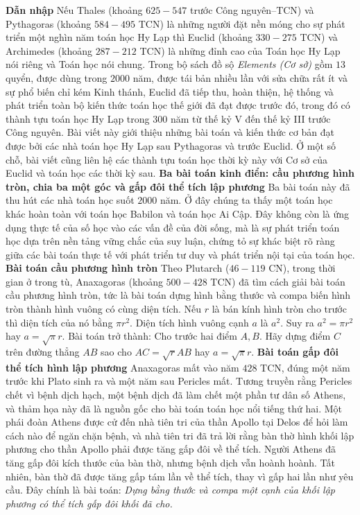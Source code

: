 \begin{multicols}{2}
	\textbf{\color{lichsutoanhoc}Dẫn nhập}
	\vskip 0.05cm
	Nếu Thales (khoảng $625-547$ trước Công nguyên--TCN) và Pythagoras (khoảng $584-495$ TCN) là những người đặt nền móng cho sự phát triển một nghìn năm toán học Hy Lạp thì Euclid (khoảng $330-275$ TCN) và  Archimedes (khoảng $287-212$ TCN) là những đỉnh cao của Toán học Hy Lạp nói riêng và Toán học nói chung. Trong bộ sách đồ sộ \textit{Elements (Cơ sở)}  gồm $13$ quyển, được dùng trong $2000$ năm, được tái bản nhiều lần với sửa chữa rất ít và sự phổ biến chỉ kém Kinh thánh, Euclid đã tiếp thu, hoàn thiện, hệ thống và phát triển toàn bộ kiến thức toán học thế giới đã đạt được trước đó, trong đó có thành tựu toán học Hy Lạp trong $300$ năm từ thế kỷ V đến thế kỷ III trước Công nguyên. 
	\vskip 0.05cm
	Bài viết này giới thiệu những bài toán và kiến thức cơ bản đạt được bởi các nhà toán học Hy Lạp sau Pythagoras và trước Euclid. Ở một số chỗ, bài viết cũng liên hệ các thành tựu toán học thời kỳ này với Cơ sở của Euclid và toán học các thời kỳ sau.    
	\vskip 0.05cm
	\textbf{\color{lichsutoanhoc}Ba bài toán kinh điển: cầu phương hình tròn, chia ba một góc và gấp đôi thể tích lập phương}
	\vskip 0.05cm
	Ba bài toán này đã thu hút các nhà toán học suốt $2000$ năm. Ở đây chúng ta thấy một toán học khác hoàn toàn với toán học Babilon và toán học Ai Cập. Đây không còn là ứng dụng thực tế của số học vào các vấn đề của đời sống, mà là sự phát triển toán học dựa trên nền tảng vững chắc  của suy luận, chứng tỏ sự khác biệt rõ ràng giữa các bài toán thực tế với phát triển tư duy và phát triển nội tại của toán học.
	\vskip 0.05cm
	\textbf{\color{lichsutoanhoc}Bài toán cầu phương hình tròn}
	\vskip 0.05cm
	Theo Plutarch ($46-119$ CN), trong thời gian ở trong tù, Anaxagoras (khoảng $500-428$ TCN) đã tìm cách giải bài toán cầu phương hình tròn, tức là bài toán dựng hình bằng thước và compa biến hình tròn thành hình vuông có cùng diện tích. 
	\vskip 0.05cm
	Nếu $r$ là bán kính hình tròn cho trước thì diện tích của nó bằng $\pi r^2$. Diện tích hình vuông cạnh $a$  là $a^2$. Suy ra  $a^2 = \pi r^2$ hay  $a=\sqrt{\pi}r$. Bài toán trở thành: Cho trước hai điểm $A,B$. Hãy dựng điểm $C$  trên đường thẳng  $AB$  sao cho $AC = \sqrt{r}AB$  hay $a= \sqrt{\pi}r$.
	\vskip 0.05cm 
	\textbf{\color{lichsutoanhoc}Bài toán gấp đôi thể tích hình lập phương}
	\vskip 0.05cm
	Anaxagoras mất vào năm $428$ TCN, đúng một năm trước khi Plato sinh ra và một năm sau Pericles mất. Tương truyền rằng Pericles chết vì bệnh dịch hạch, một bệnh dịch đã làm chết một phần tư dân số Athens, và thảm họa này đã là nguồn gốc cho bài toán toán học nổi tiếng thứ hai. Một phái đoàn Athens được cử đến nhà tiên tri của thần Apollo tại Delos để hỏi làm cách nào để ngăn chặn bệnh, và nhà tiên tri đã trả lời rằng bàn thờ hình khối lập phương cho thần Apollo phải được tăng gấp đôi về thể tích. Người Athens đã tăng gấp đôi kích thước của bàn thờ, nhưng bệnh dịch vẫn hoành hoành. Tất nhiên, bàn thờ đã được tăng gấp tám lần về thể tích, thay vì gấp hai lần như yêu cầu. Đây chính là bài toán: \textit{Dựng bằng thước và compa một cạnh của khối lập phương có thể tích gấp đôi khối đã cho.}

\end{multicols}
